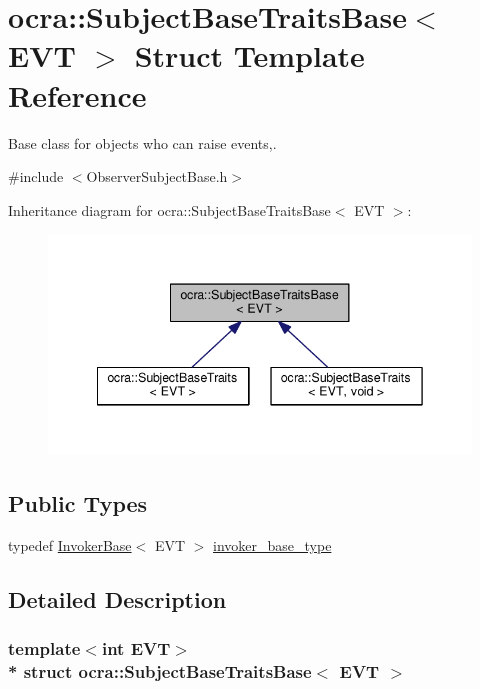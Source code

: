 \hypertarget{structocra_1_1SubjectBaseTraitsBase}{}\section{ocra\+:\+:Subject\+Base\+Traits\+Base$<$ E\+VT $>$ Struct Template Reference}
\label{structocra_1_1SubjectBaseTraitsBase}


Base class for objects who can raise events,.  




{\ttfamily \#include $<$Observer\+Subject\+Base.\+h$>$}



Inheritance diagram for ocra\+:\+:Subject\+Base\+Traits\+Base$<$ E\+VT $>$\+:
\nopagebreak
\begin{figure}[H]
\begin{center}
\leavevmode
\includegraphics[width=342pt]{df/dc4/structocra_1_1SubjectBaseTraitsBase__inherit__graph}
\end{center}
\end{figure}
\subsection*{Public Types}
\begin{DoxyCompactItemize}
\item 
typedef \hyperlink{classocra_1_1InvokerBase}{Invoker\+Base}$<$ E\+VT $>$ \hyperlink{structocra_1_1SubjectBaseTraitsBase_a439671662c8f8f3e80e6675f008dec3f}{invoker\+\_\+base\+\_\+type}
\end{DoxyCompactItemize}


\subsection{Detailed Description}
\subsubsection*{template$<$int E\+VT$>$\\*
struct ocra\+::\+Subject\+Base\+Traits\+Base$<$ E\+V\+T $>$}

